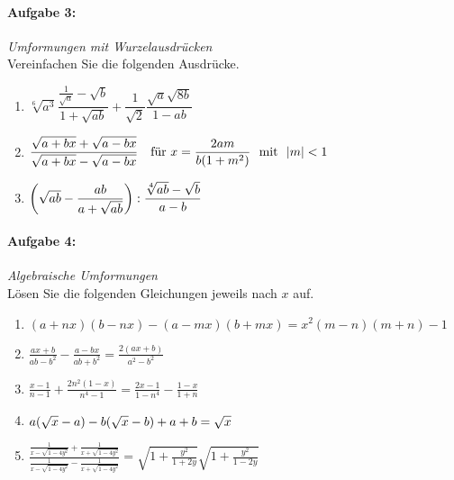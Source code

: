 \paragraph{Aufgabe 3: } \emph{Umformungen mit Wurzelausdrücken}\\[0.2cm]
Vereinfachen Sie die folgenden Ausdrücke.

\begin{enumerate}[label=(\alph*)]
    \item $\sqrt[6]{a^3}\dfrac{\frac{1}{\sqrt{a}}-\sqrt{b}}{1+\sqrt{ab}}+\dfrac{1}{\sqrt{2}}\dfrac{\sqrt{a}\sqrt{8b}}{1-ab}$
    \item $\dfrac{\sqrt{a+bx}+\sqrt{a-bx}}{\sqrt{a+bx}-\sqrt{a-bx}} \quad \textnormal{für}\,\, x=\dfrac{2am}{b(1+m^2)}\,\,\textnormal{ mit }\,\, |m|<1$
    \item $\qty(\sqrt{ab}-\dfrac{ab}{a+\sqrt{ab}}):\dfrac{\sqrt[4]{ab}-\sqrt{b}}{a-b}$
\end{enumerate}

%
\paragraph{Aufgabe 4: } \emph{Algebraische Umformungen}\\[0.2cm]
Lösen Sie die folgenden Gleichungen jeweils nach $x$ auf.

\begin{enumerate}[label=(\alph*)]
    \item $(a+nx)(b-nx)-(a-mx)(b+mx)=x^2(m-n)(m+n)-1$
    \item $\frac{ax+b}{ab-b^2}-\frac{a-bx}{ab+b^2}=\frac{2(ax+b)}{a^2-b^2}$
    \item $\frac{x-1}{n-1}+\frac{2n^2(1-x)}{n^4-1}=\frac{2x-1}{1-n^4}-\frac{1-x}{1+n}$
    \item $a\qty(\sqrt{x}-a)-b\qty(\sqrt{x}-b)+a+b=\sqrt{x}$
    \item $\frac{\frac{1}{x-\sqrt{1-4y^2}}+\frac{1}{x+\sqrt{1-4y^2}}}{\frac{1}{x-\sqrt{1-4y^2}}-\frac{1}{x+\sqrt{1-4y^2}}}=\sqrt{1+\frac{y^2}{1+2y}}\sqrt{1+\frac{y^2}{1-2y}}$
\end{enumerate}